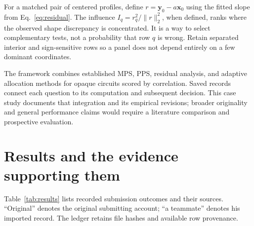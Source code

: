 \documentclass[11pt]{article}
\begin{document}
For a matched pair of centered profiles, define $r=\mathbf y_0-a\mathbf x_0$ using the fitted slope from Eq.~\eqref{eq:residual}. The influence $I_q=r_q^2/\|r\|_2^2$, when defined, ranks where the observed shape discrepancy is concentrated. It is a way to select complementary tests, not a probability that row $q$ is wrong. Retain separated interior and sign-sensitive rows so a panel does not depend entirely on a few dominant coordinates.

The framework combines established MPS, PPS, residual analysis, and adaptive allocation methods for opaque circuits scored by correlation. Saved records connect each question to its computation and subsequent decision. This case study documents that integration and its empirical revisions; broader originality and general performance claims would require a literature comparison and prospective evaluation.

\newpage
\section{Results and the evidence supporting them}
Table~\ref{tab:results} lists recorded submission outcomes and their sources. ``Original'' denotes the original submitting account; ``a teammate'' denotes his imported record. The ledger retains file hashes and available row provenance.\cite{ledger,teammate-1}
\end{document}

